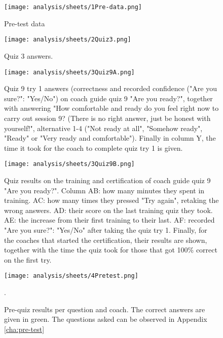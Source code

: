\begin{figure}[h]
    \centering
    \texttt{[image: analysis/sheets/1Pre-data.png]}
    \caption{Pre-test data}
    \label{fig:1Pre-data}
\end{figure}

\begin{figure}[h]
    \centering
    \texttt{[image: analysis/sheets/2Quiz3.png]}
    \caption{Quiz 3 answers.}
    \label{fig:2Quiz3}
\end{figure}

\begin{figure}[h]
    \centering
    \texttt{[image: analysis/sheets/3Quiz9A.png]}
    \caption{Quiz 9 try 1 answers (correctness and recorded confidence ("Are you sure?": "Yes/No") on coach guide quiz 9 "Are you ready?", together with answering "How comfortable and ready do you feel right now to carry out session 9? (There is no right answer, just be honest with yourself!", alternative 1-4 ("Not ready at all", "Somehow ready", "Ready" or "Very ready and comfortable"). Finally in column Y, the time it took for the coach to complete quiz try 1 is given.}
    \label{fig:3Quiz9A}
\end{figure}

\begin{figure}[h]
    \centering
    \texttt{[image: analysis/sheets/3Quiz9B.png]}
    \caption{Quiz results on the training and certification of coach guide quiz 9 "Are you ready?". Column AB: how many minutes they spent in training. AC: how many times they pressed "Try again", retaking the wrong answers. AD: their score on the last training quiz they took. AE: the increase from their first training to their last. AF: recorded "Are you sure?": "Yes/No" after taking the quiz try 1. Finally, for the coaches that started the certification, their results are shown, together with the time the quiz took for those that got 100\% correct on the first try.}
    \label{fig:3Quiz9B}
\end{figure}

\begin{figure}[h]
    \centering
    \texttt{[image: analysis/sheets/4Pretest.png]}
    \caption{Pre-quiz results per question and coach. The correct answers are given in green. The questions asked can be observed in Appendix \ref{cha:pre-test}}.
    \label{fig:4Pretest}
\end{figure}

\clearpage

